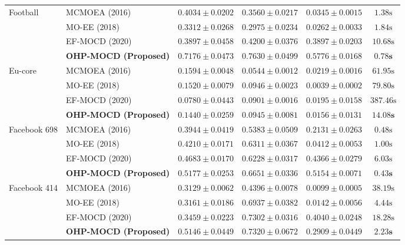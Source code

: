 \documentclass{svproc}
\begin{document}
\begin{table}[t]
{\begin{tabular}{@{}llcccc@{}}
\midrule
Football & MCMOEA (2016) & $0.4034 \pm 0.0202$ & $0.3560 \pm 0.0217$ & $0.0345 \pm 0.0015$ & $1.38\text{s}$ \\
 & MO-EE (2018) & $0.3312 \pm 0.0268$ & $0.2975 \pm 0.0234$ & $0.0262 \pm 0.0033$ & $1.84\text{s}$ \\
 & EF-MOCD (2020) & $0.3897 \pm 0.0458$ & $0.4200 \pm 0.0376$ & $0.3897 \pm 0.0203$ & $10.68\text{s}$ \\
 & \textbf{OHP-MOCD (Proposed)} & $\mathbf{0.7176 \pm 0.0473}$ & $\mathbf{0.7630 \pm 0.0499}$ & $\mathbf{0.5776 \pm 0.0168}$ & $\mathbf{0.78\text{s}}$ \\
\midrule
Eu-core & MCMOEA (2016) & $\mathbf{0.1594 \pm 0.0048}$ & $0.0544 \pm 0.0012$ & $\mathbf{0.0219 \pm 0.0016}$ & $61.95\text{s}$ \\
 & MO-EE (2018) & $0.1520 \pm 0.0079$ & $\mathbf{0.0946 \pm 0.0023}$ & $0.0039 \pm 0.0002$ & $79.80\text{s}$ \\
 & EF-MOCD (2020) & $0.0780 \pm 0.0443$ & $0.0901 \pm 0.0016$ & $0.0195 \pm 0.0158$ & $387.46\text{s}$ \\
 & \textbf{OHP-MOCD (Proposed)} & $0.1440 \pm 0.0259$ & $\mathbf{0.0945 \pm 0.0081}$ & $0.0156 \pm 0.0131$ & $\mathbf{14.08\text{s}}$ \\
\midrule
Facebook 698 & MCMOEA (2016) & $0.3944 \pm 0.0419$ & $0.5383 \pm 0.0509$ & $0.2131 \pm 0.0263$ & $0.48\text{s}$ \\
 & MO-EE (2018) & $0.4210 \pm 0.0171$ & $0.6311 \pm 0.0367$ & $0.0412 \pm 0.0053$ & $1.00\text{s}$ \\
 & EF-MOCD (2020) & $0.4683 \pm 0.0170$ & $0.6228 \pm 0.0317$ & $0.4366 \pm 0.0279$ & $6.03\text{s}$ \\
 & \textbf{OHP-MOCD (Proposed)} & $\mathbf{0.5177 \pm 0.0253}$ & $\mathbf{0.6651 \pm 0.0336}$ & $\mathbf{0.5154 \pm 0.0071}$ & $\mathbf{0.43\text{s}}$ \\
\midrule
Facebook 414 & MCMOEA (2016) & $0.3129 \pm 0.0062$ & $0.4396 \pm 0.0078$ & $0.0099 \pm 0.0005$ & $38.19\text{s}$ \\
 & MO-EE (2018) & $0.3161 \pm 0.0186$ & $0.6937 \pm 0.0382$ & $0.0142 \pm 0.0056$ & $4.44\text{s}$ \\
 & EF-MOCD (2020) & $0.3459 \pm 0.0223$ & $0.7302 \pm 0.0316$ & $\mathbf{0.4040 \pm 0.0248}$ & $18.28\text{s}$ \\
 & \textbf{OHP-MOCD (Proposed)} & $\mathbf{0.5146 \pm 0.0449}$ & $\mathbf{0.7320 \pm 0.0672}$ & $0.2909 \pm 0.0449$ & $\mathbf{2.23\text{s}}$ \\

\end{tabular}}
\end{table}
\end{document}
